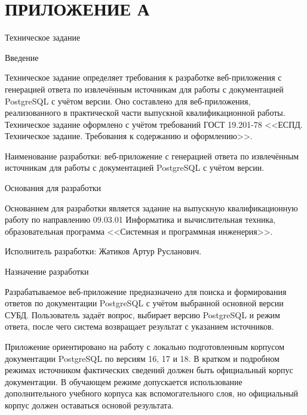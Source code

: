 
\chapter[ПРИЛОЖЕНИЕ А]{{\fontsize{14pt}{21pt}\selectfont\MakeUppercase{ПРИЛОЖЕНИЕ А}}}
\label{cha:appendix-a}
\begin{center}
{\normalfont\fontsize{14pt}{21pt}\selectfont Техническое задание}
\end{center}

\newcommand{\appendixtzheading}[1]{%
  \par\addvspace{\GostBeforTitleSkip}%
  \noindent\hspace*{\parindent}%
  \parbox[t]{\dimexpr\linewidth-\parindent\relax}{\normalfont #1}%
  \par\addvspace{\GostAfterTitleSkip}%
}

\appendixtzheading{Введение}

Техническое задание определяет требования к разработке веб-приложения с генерацией ответа по извлечённым источникам для работы с документацией PostgreSQL с учётом версии. Оно составлено для веб-приложения, реализованного в практической части выпускной квалификационной работы. Техническое задание оформлено с учётом требований ГОСТ 19.201-78 <<ЕСПД. Техническое задание. Требования к содержанию и оформлению>>.

Наименование разработки: веб-приложение с генерацией ответа по извлечённым источникам для работы с документацией PostgreSQL с учётом версии.

\appendixtzheading{Основания для разработки}

Основанием для разработки является задание на выпускную квалификационную работу по направлению 09.03.01 Информатика и вычислительная техника, образовательная программа <<Системная и программная инженерия>>.

Исполнитель разработки: Жатиков Артур Русланович.

\appendixtzheading{Назначение разработки}

Разрабатываемое веб-приложение предназначено для поиска и формирования ответов по документации PostgreSQL с учётом выбранной основной версии СУБД. Пользователь задаёт вопрос, выбирает версию PostgreSQL и режим ответа, после чего система возвращает результат с указанием источников.

Приложение ориентировано на работу с локально подготовленным корпусом документации PostgreSQL по версиям 16, 17 и 18. В кратком и подробном режимах источником фактических сведений должен быть официальный корпус документации. В обучающем режиме допускается использование дополнительного учебного корпуса как вспомогательного слоя, но официальный корпус должен оставаться основой результата.

